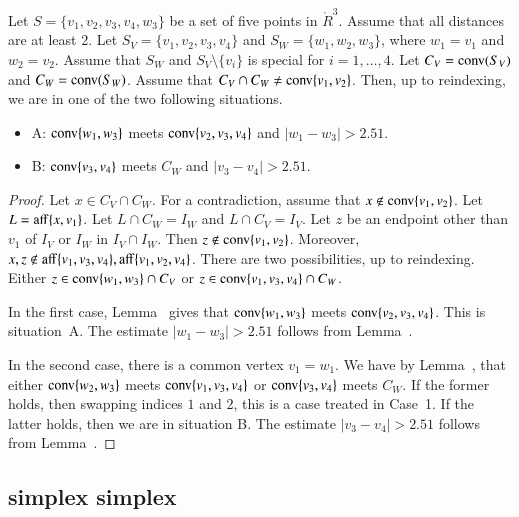\begin{lemma}
Let $S=\{v_1,v_2,v_3,v_4,w_3\}$ be a set of five points in $\ring{R}^3$.
Assume that all distances are at least $2$. 
Let $S_V =\{v_1,v_2,v_3,v_4\}$ and $S_W=\{w_1,w_2,w_3\}$, where
$w_1=v_1$ and $w_2=v_2$.  
Assume that $S_W$ and $S_V\setminus\{v_i\}$ is special for $i=1,\ldots,4$.
Let $C_V={\operatorname{conv}}(S_V)$ and $C_W={\operatorname{conv}}(S_W)$.
Assume that $C_V\cap C_W\ne {\operatorname{conv}}\{v_1,v_2\}$.
Then, up to reindexing, we are in one of the two following situations.
\begin{itemize}
\item A: ${\operatorname{conv}}\{w_1,w_3\}$ meets ${\operatorname{conv}}\{v_2,v_3,v_4\}$
and $|w_1-w_3|>2.51$.
\item B:  ${\operatorname{conv}}\{v_3,v_4\}$ meets $C_W$ and $|v_3-v_4|>2.51$.
\end{itemize}
\end{lemma}

\begin{proof}
Let $x\in C_V\cap C_W$.  For a contradiction, assume that
$x\not\in{\operatorname{conv}}\{v_1,v_2\}$.  Let $L={\operatorname{aff}}\{x,v_1\}$.
Let $L\cap C_W = I_W$ and $L\cap C_V = I_V$.  Let $z$ be an endpoint
other than $v_1$
of $I_V$ or $I_W$ in $I_V\cap I_W$.  Then $z\not\in{\operatorname{conv}}\{v_1,v_2\}$. 
Moreover, $x,z\not\in{\operatorname{aff}}\{v_1,v_3,v_4\},{\operatorname{aff}}\{v_1,v_2,v_4\}$. 
There are two possibilities, up to reindexing.
Either $z\in {\operatorname{conv}}\{w_1,w_3\}\cap C_V$ or 
$z\in{\operatorname{conv}}\{v_1,v_3,v_4\}\cap C_W$.

In the first case, Lemma~ gives that ${\operatorname{conv}}\{w_1,w_3\}$
meets ${\operatorname{conv}}\{v_2,v_3,v_4\}$.  This is situation~A.  The estimate
$|w_1-w_3|>2.51$ follows from Lemma~.\FIXX{$\CalE$}

In the second case, there is a common vertex $v_1=w_1$.  We have
by Lemma~, that either ${\operatorname{conv}}\{w_2,w_3\}$ meets
${\operatorname{conv}}\{v_1,v_3,v_4\}$ or ${\operatorname{conv}}\{v_3,v_4\}$ meets
$C_W$.  If the former holds, then swapping indices $1$ and $2$,
this is a case treated in Case~1.  If the latter holds, then
we are in situation B.  The estimate $|v_3-v_4|>2.51$ follows
from Lemma~.\FIXX{$\CalE$}
\end{proof}

\newpage

\subsection{simplex simplex}

